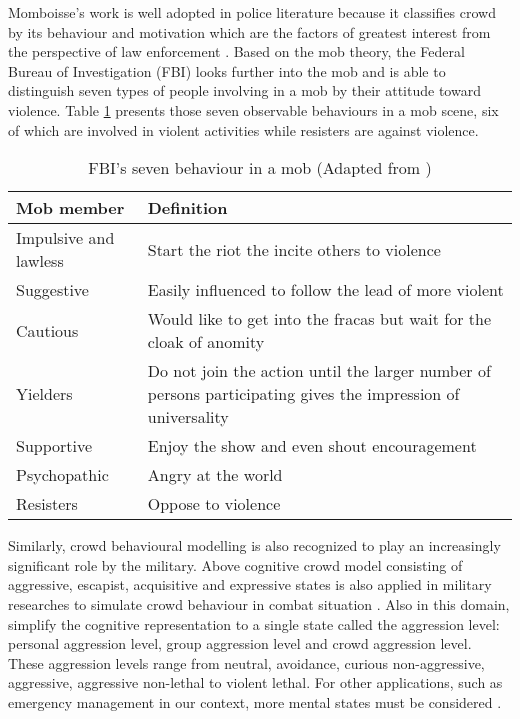 Momboisse’s work is well adopted in police literature because it classifies crowd by its behaviour and motivation which are the factors of greatest interest from the perspective of law enforcement \citep{FBI1967}. Based on the mob theory, the Federal Bureau of Investigation (FBI) looks further into the mob and is able to distinguish seven types of people involving in a mob by their attitude toward violence. Table \ref{table:fbiMobBehavior} presents those seven observable behaviours in a mob scene, six of which are involved in violent activities while resisters are against violence.

\begin{table}
	\caption{FBI's seven behaviour in a mob (Adapted from \citet{FBI1967})}
	\label{table:fbiMobBehavior}
	\centering
	\begin{tabular}{|l|p{10cm}|}
	\hline
	\textbf{Mob member} & \textbf{Definition} \\
	\hline
	Impulsive and lawless & Start the riot the incite others to violence \\
	Suggestive &  Easily influenced to follow the lead of more violent \\
	Cautious & Would like to get into the fracas but wait for the cloak of anomity \\
	Yielders & Do not join the action until the larger number of persons participating gives the impression of universality \\
	Supportive & Enjoy the show and even shout encouragement \\
	Psychopathic & Angry at the world \\
	Resisters & Oppose to violence \\			
	\hline
	\end{tabular}
\end{table}

Similarly, crowd behavioural modelling is also recognized to play an increasingly significant role by the military. Above cognitive crowd model consisting of aggressive, escapist, acquisitive and expressive states is also applied in military researches to simulate crowd behaviour in combat situation \citep{Petty2004}. Also in this domain, \citet{Nguyen2005} simplify the cognitive representation to a single state called the aggression level: personal aggression level, group aggression level and crowd aggression level. These aggression levels range from neutral, avoidance, curious non-aggressive, aggressive, aggressive non-lethal to violent lethal. For other applications, such as emergency management in our context, more mental states must be considered \citep{Zhou2010}.

